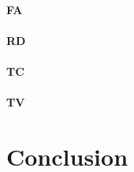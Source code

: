 \documentclass[a4paper,11pt]{report}
\begin{document}
      \subsubsection{FA}
      

      \subsubsection{RD}

      \subsubsection{TC}

      \subsubsection{TV}

\chapter{Conclusion}
\end{document}
